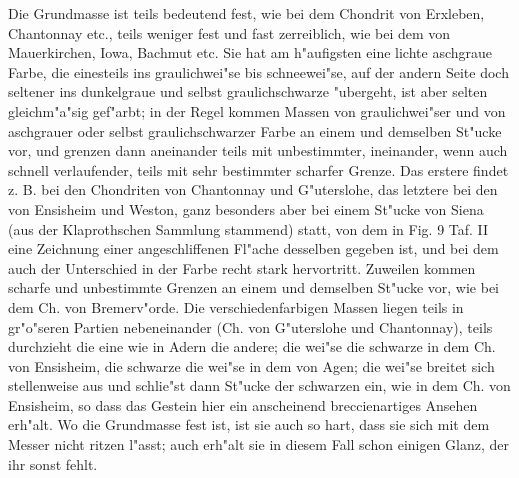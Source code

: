 \documentclass[a4paper, 11pt, oneside, german]{article}
\begin{document}
Die Grundmasse ist teils bedeutend fest, wie bei dem Chondrit von Erxleben, Chantonnay etc., teils weniger fest und fast zerreiblich, wie bei dem von Mauerkirchen, Iowa, Bachmut etc. Sie hat am h"aufigsten eine lichte aschgraue Farbe, die einesteils ins graulichwei"se bis schneewei"se, auf der andern Seite doch seltener ins dunkelgraue und selbst graulichschwarze "ubergeht, ist aber selten gleichm"a"sig gef"arbt; in der Regel kommen Massen von graulichwei"ser und von aschgrauer oder selbst graulichschwarzer Farbe an einem und demselben St"ucke vor, und grenzen dann aneinander teils mit unbestimmter, ineinander, wenn auch schnell verlaufender, teils mit sehr bestimmter scharfer Grenze. Das erstere findet z. B. bei den Chondriten von Chantonnay und G"uterslohe, das letztere bei den von Ensisheim und Weston, ganz besonders aber bei einem St"ucke von Siena (aus der Klaprothschen Sammlung stammend) statt, von dem in Fig. 9 Taf. II eine Zeichnung einer angeschliffenen Fl"ache desselben gegeben ist, und bei dem auch der Unterschied in der Farbe recht stark hervortritt. Zuweilen kommen scharfe und unbestimmte Grenzen an einem und demselben St"ucke vor, wie bei dem Ch. von Bremerv"orde. Die verschiedenfarbigen Massen liegen teils in gr"o"seren Partien nebeneinander (Ch. von G"uterslohe und Chantonnay), teils durchzieht die eine wie in Adern die andere; die wei"se die schwarze in dem Ch. von Ensisheim, die schwarze die wei"se in dem von Agen; die wei"se breitet sich stellenweise aus und schlie"st dann St"ucke der schwarzen ein, wie in dem Ch. von Ensisheim, so dass das Gestein hier ein anscheinend breccienartiges Ansehen erh"alt. Wo die Grundmasse fest ist, ist sie auch so hart, dass sie sich mit dem Messer nicht ritzen l"asst; auch erh"alt sie in diesem Fall schon einigen Glanz, der ihr sonst fehlt.
\end{document}
